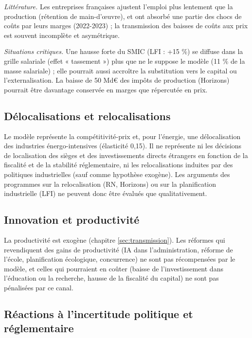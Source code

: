 \documentclass[
  11pt,
  11pt,
  a4paper,
  openany]{book}
\begin{document}
\emph{Littérature.} Les entreprises françaises ajustent l'emploi plus
lentement que la production (rétention de main-d'œuvre), et ont absorbé
une partie des chocs de coûts par leurs marges (2022-2023) ; la
transmission des baisses de coûts aux prix est souvent incomplète et
asymétrique.

\emph{Situations critiques.} Une hausse forte du SMIC (LFI : +15 \%) se
diffuse dans la grille salariale (effet « tassement ») plus que ne le
suppose le modèle (11 \% de la masse salariale) ; elle pourrait aussi
accroître la substitution vers le capital ou l'externalisation. La
baisse de 50 Md€ des impôts de production (Horizons) pourrait être
davantage conservée en marges que répercutée en prix.

\hypertarget{duxe9localisations-et-relocalisations}{%
\subsection{Délocalisations et
relocalisations}\label{duxe9localisations-et-relocalisations}}

Le modèle représente la compétitivité-prix et, pour l'énergie, une
délocalisation des industries énergo-intensives (élasticité 0,15). Il ne
représente ni les décisions de localisation des sièges et des
investissements directs étrangers en fonction de la fiscalité et de la
stabilité réglementaire, ni les relocalisations induites par des
politiques industrielles (sauf comme hypothèse exogène). Les arguments
des programmes sur la relocalisation (RN, Horizons) ou sur la
planification industrielle (LFI) ne peuvent donc être évalués que
qualitativement.

\hypertarget{innovation-et-productivituxe9}{%
\subsection{Innovation et
productivité}\label{innovation-et-productivituxe9}}

La productivité est exogène (chapitre \ref{sec:transmission}). Les
réformes qui revendiquent des gains de productivité (IA dans
l'administration, réforme de l'école, planification écologique,
concurrence) ne sont pas récompensées par le modèle, et celles qui
pourraient en coûter (baisse de l'investissement dans l'éducation ou la
recherche, hausse de la fiscalité du capital) ne sont pas pénalisées par
ce canal.

\hypertarget{ruxe9actions-uxe0-lincertitude-politique-et-ruxe9glementaire}{%
\subsection{Réactions à l'incertitude politique et
réglementaire}\label{ruxe9actions-uxe0-lincertitude-politique-et-ruxe9glementaire}}
\end{document}
